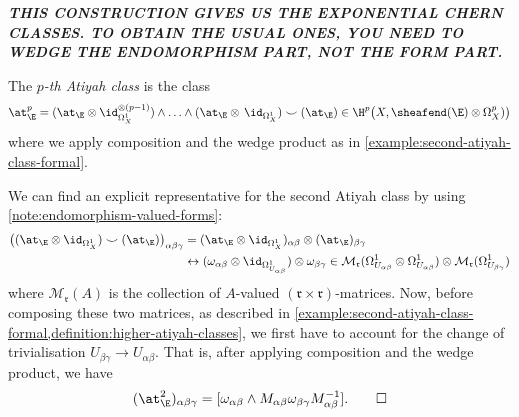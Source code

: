         \textbf{\emph{THIS CONSTRUCTION GIVES US THE EXPONENTIAL CHERN CLASSES. TO OBTAIN THE USUAL ONES, YOU NEED TO WEDGE THE ENDOMORPHISM PART, NOT THE FORM PART.}}

        \begin{definition}\label{definition:higher-atiyah-classes}
            The \textit{$p$-th Atiyah class} is the class
            \[
                \at_\E^p = (\at_\E\otimes\id_{\Omega_X^1}^{\otimes(p-1)})\wedge\ldots\wedge(\at_\E\otimes\,\id_{\Omega_X^1})\smile(\at_\E) \in \H^p\big(X,\sheafend(\E)\otimes\Omega_X^p)\big)
            \]
            where we apply composition and the wedge product as in \cref{example:second-atiyah-class-formal}.
        \end{definition}
        
        \begin{example}\label{example:second-atiyah-class}
            We can find an explicit representative for the second Atiyah class by using \cref{note:endomorphism-valued-forms}:
            \begin{align*}
                \big((\at_\E\otimes\id_{\Omega_X^1})\smile(\at_\E)\big)_{\alpha\beta\gamma} &= (\at_\E\otimes\id_{\Omega_X^1})_{\alpha\beta}\otimes(\at_\E)_{\beta\gamma}\\
                &\leftrightarrow (\omega_{\alpha\beta}\otimes\id_{\Omega_{U_{\alpha\beta}}^1})\otimes\omega_{\beta\gamma} \in \mathcal{M}_\mathfrak{r}(\Omega_{U_{\alpha\beta}}^1\otimes\Omega_{U_{\alpha\beta}}^1) \otimes \mathcal{M}_\mathfrak{r}(\Omega_{U_{\beta\gamma}}^1)
            \end{align*}
            where $\mathcal{M}_\mathfrak{r}(A)$ is the collection of $A$-valued $(\mathfrak{r}\times \mathfrak{r})$-matrices.
            Now, before composing these two matrices, as described in \cref{example:second-atiyah-class-formal,definition:higher-atiyah-classes}, we first have to account for the change of trivialisation $U_{\beta\gamma}\to U_{\alpha\beta}$.
            That is, after applying composition and the wedge product, we have
            \[
                (\at_\E^2)_{\alpha\beta\gamma} = [\omega_{\alpha\beta}\wedge M_{\alpha\beta}\omega_{\beta\gamma}M_{\alpha\beta}^{-1}].\qedhere
            \]
        \end{example}


